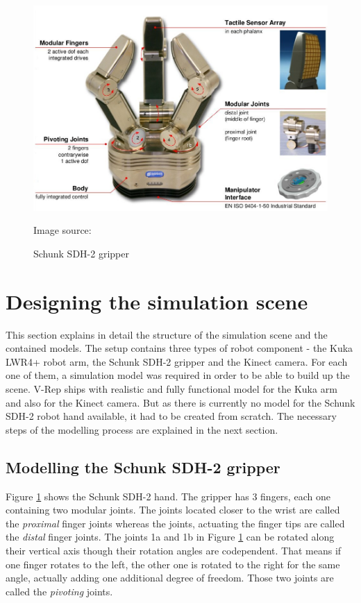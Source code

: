 \begin{figure}[ht]
	\centering
  	\includegraphics[width=1.0\textwidth]{images/sdh_sheet.jpg}
	\caption{Schunk SDH-2 gripper}
	{\scriptsize Image source: \cite{schunk2010}}
	\label{fig:sdh_sheet}
\end{figure}

\section{Designing the simulation scene}

This section explains in detail the structure of the simulation scene and the contained models. The setup contains three types of robot component - the Kuka LWR4+ robot arm, the Schunk SDH-2 gripper and the Kinect camera. For each one of them, a simulation model was required in order to be able to build up the scene. V-Rep ships with realistic and fully functional model for the Kuka arm and also for the Kinect camera. But as there is currently no model for the Schunk SDH-2 robot hand available, it had to be created from scratch. The necessary steps of the modelling process are explained in the next section.

\subsection{Modelling the Schunk SDH-2 gripper}

Figure \ref{fig:sdh_sheet} shows the Schunk SDH-2 hand. The gripper has 3 fingers, each one containing two modular joints. The joints located closer to the wrist are called the \emph{proximal} finger joints whereas the joints, actuating the finger tips are called the \emph{distal} finger joints. The joints 1a and 1b in Figure \ref{fig:sdh_sheet} can be rotated along their vertical axis though their rotation angles are codependent. That means if one finger rotates to the left, the other one is rotated to the right for the same angle, actually adding one additional degree of freedom. Those two joints are called the \emph{pivoting} joints. \\


